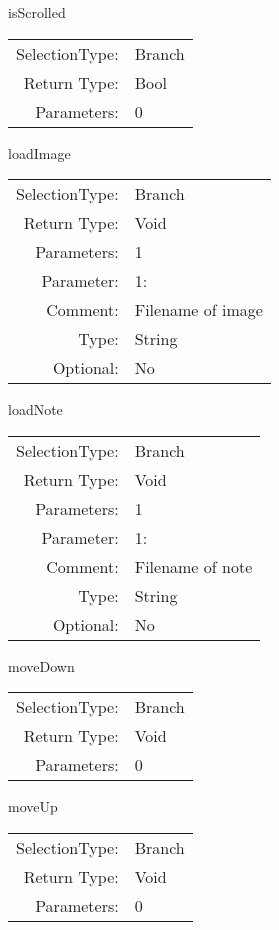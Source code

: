 \item isScrolled\\
\begin{tabular}{rl}
  SelectionType: & Branch\\
    Return Type: & Bool\\
     Parameters: & 0\\
\end{tabular}

\item loadImage\\
\begin{tabular}{rl}
  SelectionType: & Branch\\
    Return Type: & Void\\
     Parameters: & 1\\
   Parameter: &  1:\\
        Comment: & Filename of image\\
           Type: & String\\
       Optional: &  No\\
\end{tabular}

\item loadNote\\
\begin{tabular}{rl}
  SelectionType: & Branch\\
    Return Type: & Void\\
     Parameters: & 1\\
   Parameter: &  1:\\
        Comment: & Filename of note\\
           Type: & String\\
       Optional: &  No\\
\end{tabular}

\item moveDown\\
\begin{tabular}{rl}
  SelectionType: & Branch\\
    Return Type: & Void\\
     Parameters: & 0\\
\end{tabular}

\item moveUp\\
\begin{tabular}{rl}
  SelectionType: & Branch\\
    Return Type: & Void\\
     Parameters: & 0\\
\end{tabular}

